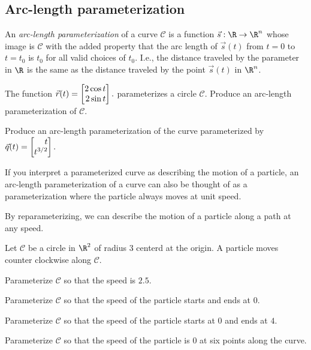 \subsection*{Arc-length parameterization}
	An \emph{arc-length parameterization} of a curve $\mathcal C$ 
	is a function $\vec s:\R\to\R^n$ whose
	image is $\mathcal C$ with the added property that the arc 
	length of $\vec s(t)$ from $t=0$ to $t=t_0$
	is $t_0$ for all valid choices of $t_0$.  I.e., the distance 
	traveled by the parameter in
	$\R$ is the same as the distance traveled by the 
	point $\vec s(t)$ in $\R^n$.


\begin{question}
	\begin{parts}
		\item The function
			$
				\vec r(t) =\mat{2\cos t\\ 2\sin t}.
			$
			parameterizes a circle $\mathcal C$.  Produce an arc-length parameterization
			of $\mathcal C$.
		\item Produce an arc-length parameterization of the curve parameterized by
			$
				\vec q(t) =\mat{t\\ t^{3/2}}.
			$
	\end{parts}
\end{question}
	
	If you interpret a parameterized curve as describing the motion of a
	particle,
	an arc-length parameterization of a curve can also be thought of
	as a parameterization where the particle always moves at unit speed.

	By reparameterizing, we can describe the motion of a particle along
	a path at any speed.

\begin{question}
	Let $\mathcal C$ be a circle in $\R^2$ of radius $3$ centerd at the origin.
	A particle moves counter clockwise along $\mathcal C$.
	\begin{parts}
		\item Parameterize $\mathcal C$ so that the speed is $2.5$.
		\item Parameterize $\mathcal C$ so that the speed of the particle starts and ends at $0$.
		\item Parameterize $\mathcal C$ so that the speed of the particle starts at $0$ and ends at $4$.
		\item Parameterize $\mathcal C$ so that the speed of the particle is $0$ at six points along the curve.
	\end{parts}
\end{question}

